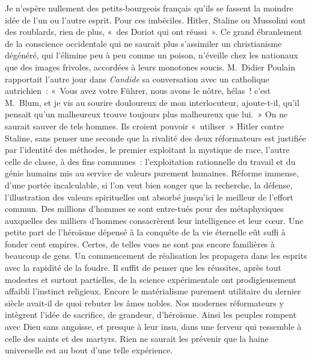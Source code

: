 \documentclass[french,twoside]{book} %
\begin{document}
Je n’espère nullement des petits-bourgeois français qu’ils se fassent la moindre idée de l’un ou l’autre esprit. Pour ces imbéciles. Hitler, Staline ou Mussolini sont des roublards, rien de plus, « des Doriot qui ont réussi ». Ce grand ébranlement de la conscience occidentale qui ne saurait plus s’assimiler un christianisme dégénéré, qui l’élimine peu à peu comme un poison, n’éveille chez les nationaux que des images frivoles, accordées à leurs monotones soucis. M. Didier Poulain rapportait l’autre jour dans \emph{Candide} sa conversation avec un catholique autrichien : « Vous avez votre Führer, nous avons le nôtre, hélas ! c’est M. Blum, et je vis au sourire douloureux de mon interlocuteur, ajoute-t-il, qu’il pensait qu’un malheureux trouve toujours plus malheureux que lui. » On ne saurait sauver de tels hommes. Ils croient pouvoir « utiliser » Hitler contre Staline, sans penser une seconde que la rivalité des deux réformateurs est justifiée par l’identité des méthodes, le premier exploitant la mystique de race, l’autre celle de classe, à des fins communes : l’exploitation rationnelle du travail et du génie humains mis au service de valeurs purement humaines. Réforme immense, d’une portée incalculable, si l’on veut bien songer que la recherche, la défense, l’illustration des valeurs spirituelles ont absorbé jusqu’ici le meilleur de l’effort commun. Des millions d’hommes se sont entre-tués pour des métaphysiques auxquelles des milliers d’hommes consacrèrent leur intelligence et leur cœur. Une petite part de l’héroïsme dépensé à la conquête de la vie éternelle eût suffi à fonder cent empires. Certes, de telles vues ne sont pas encore familières à beaucoup de gens. Un commencement de réalisation les propagera dans les esprits avec la rapidité de la foudre. Il suffit de penser que les réussites, après tout modestes et surtout partielles, de la science expérimentale ont prodigieusement affaibli l’instinct religieux. Encore le matérialisme purement utilitaire du dernier siècle avait-il de quoi rebuter les âmes nobles. Nos modernes réformateurs y intègrent l’idée de sacrifice, de grandeur, d’héroïsme. Ainsi les peuples rompent avec Dieu sans angoisse, et presque à leur insu, dans une ferveur qui ressemble à celle des saints et des martyrs. Rien ne saurait les prévenir que la haine universelle est au bout d’une telle expérience.\par
\end{document}
